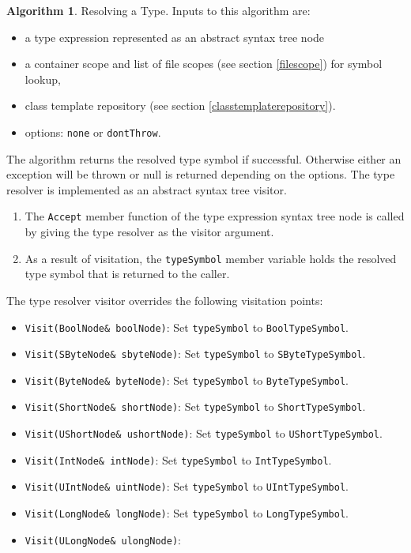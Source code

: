 \documentclass[a4paper,oneside,11pt]{book}
\theoremstyle{definition}
\newtheorem{algo}{Algorithm}[section]
\begin{document}
\begin{algo}\label{resolvingtype} Resolving a Type. Inputs to this algorithm are:
\begin{itemize}
\item
a type expression represented as an abstract syntax tree node
\item
a container scope and list of file scopes (see section \ref{filescope}) for symbol lookup,
\item
class template repository (see section \ref{classtemplaterepository}).
\item
options: \verb|none| or \verb|dontThrow|.
\end{itemize}
The algorithm returns the resolved type symbol if successful. Otherwise either an exception will be thrown or null is returned depending on the options.
The type resolver is implemented as an abstract syntax tree visitor.
\begin{enumerate}
\item
The \verb|Accept| member function of the type expression syntax tree node is called by giving the type resolver as the visitor argument.
\item
As a result of visitation, the \verb|typeSymbol| member variable holds the resolved type symbol that is returned to the caller.
\end{enumerate}
The type resolver visitor overrides the following visitation points:
\begin{itemize}
\item
\verb|Visit(BoolNode& boolNode)|:
Set \verb|typeSymbol| to \verb|BoolTypeSymbol|.
\item
\verb|Visit(SByteNode& sbyteNode)|:
Set \verb|typeSymbol| to \verb|SByteTypeSymbol|.
\item
\verb|Visit(ByteNode& byteNode)|:
Set \verb|typeSymbol| to \verb|ByteTypeSymbol|.
\item
\verb|Visit(ShortNode& shortNode)|:
Set \verb|typeSymbol| to \verb|ShortTypeSymbol|.
\item
\verb|Visit(UShortNode& ushortNode)|:
Set \verb|typeSymbol| to \verb|UShortTypeSymbol|.
\item
\verb|Visit(IntNode& intNode)|:
Set \verb|typeSymbol| to \verb|IntTypeSymbol|.
\item
\verb|Visit(UIntNode& uintNode)|:
Set \verb|typeSymbol| to \verb|UIntTypeSymbol|.
\item
\verb|Visit(LongNode& longNode)|:
Set \verb|typeSymbol| to \verb|LongTypeSymbol|.
\item
\verb|Visit(ULongNode& ulongNode)|:

\end{itemize}
\end{algo}
\end{document}

